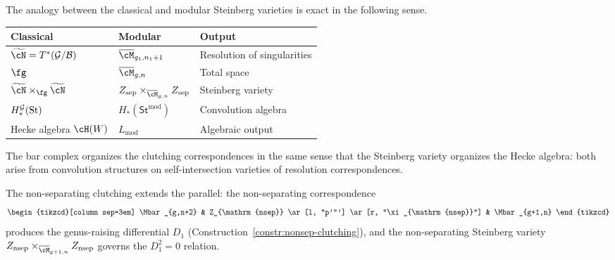 \begin{proposition}
\label{prop:steinberg-hecke-parallel}

The analogy between the classical and modular Steinberg varieties is
exact in the following sense.
\begin{center}
\renewcommand{\arraystretch}{1.3}
\begin{tabular}{lll}
\textbf{Classical} & \textbf{Modular} & \textbf{Output} \\
\hline
$\widetilde{\cN} = T^*(\cG/\cB)$ &
 $\Mbar_{g_1,n_1+1}$ &
 Resolution of singularities \\
$\fg$ &
 $\Mbar_{g,n}$ &
 Total space \\
$\widetilde{\cN} \times_\fg \widetilde{\cN}$ &
 $Z_{\mathrm{sep}} \times_{\Mbar_{g,n}} Z_{\mathrm{sep}}$ &
 Steinberg variety \\
$H_*^{\mathcal{G}}(\mathrm{St})$ &
 $H_*(\mathsf{St}^{\mathrm{mod}})$ &
 Convolution algebra \\
Hecke algebra $\cH(W)$ &
 $L_{\mathrm{mod}}$ &
 Algebraic output \\
\end{tabular}
\end{center}
The bar complex organizes the clutching correspondences in the same
sense that the Steinberg variety organizes the Hecke algebra: both
arise from convolution structures on self-intersection varieties of
resolution correspondences.

The non-separating clutching extends the parallel: the
non-separating correspondence
\begin{equation}\label{eq:nonsep-clutching-span}
\begin{tikzcd}[column sep=3em]
 \Mbar_{g,n+2}
 & Z_{\mathrm{nsep}}
 \ar[l, "p'"']
 \ar[r, "\xi_{\mathrm{nsep}}"]
 & \Mbar_{g+1,n}
\end{tikzcd}
\end{equation}
produces the genus-raising differential $D_1$
\textup{(}Construction~\textup{\ref{constr:nonsep-clutching})}, and the
non-separating Steinberg variety
$Z_{\mathrm{nsep}} \times_{\Mbar_{g+1,n}} Z_{\mathrm{nsep}}$
governs the $D_1^2 = 0$ relation.
\end{proposition}

